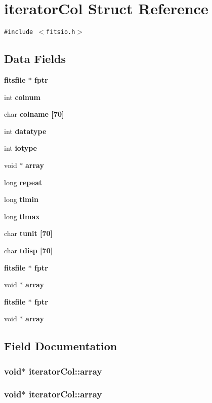 \section{iterator\-Col Struct Reference}
\label{structiteratorCol}
{\tt \#include $<$fitsio.h$>$}

\subsection*{Data Fields}
\begin{CompactItemize}
\item 
\bf{fitsfile} $\ast$ \bf{fptr}
\item 
int \bf{colnum}
\item 
char \bf{colname} [70]
\item 
int \bf{datatype}
\item 
int \bf{iotype}
\item 
void $\ast$ \bf{array}
\item 
long \bf{repeat}
\item 
long \bf{tlmin}
\item 
long \bf{tlmax}
\item 
char \bf{tunit} [70]
\item 
char \bf{tdisp} [70]
\item 
\bf{fitsfile} $\ast$ \bf{fptr}
\item 
void $\ast$ \bf{array}
\item 
\bf{fitsfile} $\ast$ \bf{fptr}
\item 
void $\ast$ \bf{array}
\end{CompactItemize}


\subsection{Field Documentation}
\subsubsection{\setlength{\rightskip}{0pt plus 5cm}void$\ast$ \bf{iterator\-Col::array}}\label{structiteratorCol_158b5f9123106f24eaca2957e5af26f4}


\subsubsection{\setlength{\rightskip}{0pt plus 5cm}void$\ast$ \bf{iterator\-Col::array}}\label{structiteratorCol_158b5f9123106f24eaca2957e5af26f4}


